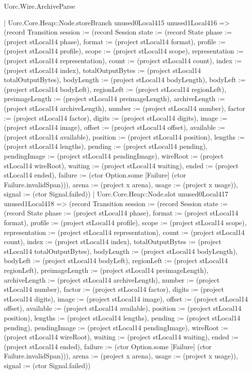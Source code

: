 \begin{lexlean}{Uorc.Wire.ArchiveParse}
\begin{semanticmodule}
{            | Uorc.Core.Heap::Node.storeBranch unused0Local415 unused1Local416 => (record Transition {session := (record Session {state := (record State {phase := (project stLocal14 phase), format := (project stLocal14 format), profile := (project stLocal14 profile), scope := (project stLocal14 scope), representation := (project stLocal14 representation), count := (project stLocal14 count), index := (project stLocal14 index), totalOutputBytes := (project stLocal14 totalOutputBytes), bodyLength := (project stLocal14 bodyLength), bodyLeft := (project stLocal14 bodyLeft), regionLeft := (project stLocal14 regionLeft), preimageLength := (project stLocal14 preimageLength), archiveLength := (project stLocal14 archiveLength), number := (project stLocal14 number), factor := (project stLocal14 factor), digits := (project stLocal14 digits), image := (project stLocal14 image), offset := (project stLocal14 offset), available := (project stLocal14 available), position := (project stLocal14 position), lengths := (project stLocal14 lengths), pending := (project stLocal14 pending), pendingImage := (project stLocal14 pendingImage), wireRoot := (project stLocal14 wireRoot), waiting := (project stLocal14 waiting), ended := (project stLocal14 ended), failure := (ctor Option.some [Failure] (ctor Failure.invalidSpan))}), arena := (project x arena), usage := (project x usage)}), signal := (ctor Signal.failed)})
            | Uorc.Core.Heap::Node.slot unused0Local417 unused1Local418 => (record Transition {session := (record Session {state := (record State {phase := (project stLocal14 phase), format := (project stLocal14 format), profile := (project stLocal14 profile), scope := (project stLocal14 scope), representation := (project stLocal14 representation), count := (project stLocal14 count), index := (project stLocal14 index), totalOutputBytes := (project stLocal14 totalOutputBytes), bodyLength := (project stLocal14 bodyLength), bodyLeft := (project stLocal14 bodyLeft), regionLeft := (project stLocal14 regionLeft), preimageLength := (project stLocal14 preimageLength), archiveLength := (project stLocal14 archiveLength), number := (project stLocal14 number), factor := (project stLocal14 factor), digits := (project stLocal14 digits), image := (project stLocal14 image), offset := (project stLocal14 offset), available := (project stLocal14 available), position := (project stLocal14 position), lengths := (project stLocal14 lengths), pending := (project stLocal14 pending), pendingImage := (project stLocal14 pendingImage), wireRoot := (project stLocal14 wireRoot), waiting := (project stLocal14 waiting), ended := (project stLocal14 ended), failure := (ctor Option.some [Failure] (ctor Failure.invalidSpan))}), arena := (project x arena), usage := (project x usage)}), signal := (ctor Signal.failed)})
}
\end{semanticmodule}
\end{lexlean}
